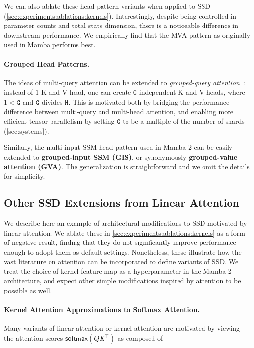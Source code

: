 We can also ablate these head pattern variants when applied to SSD (\ref{sec:experiments:ablations:kernels}).
Interestingly, despite being controlled in parameter counts and total state dimension, there is a noticeable difference in downstream performance. We empirically find that the MVA pattern as originally used in Mamba performs best.

\paragraph{Grouped Head Patterns.}

The ideas of multi-query attention can be extended to \emph{grouped-query attention}~\citep{ainslie2023gqa}: instead of $1$ K and V head, one can create $\mathtt{G}$ independent K and V heads, where $1 < \mathtt{G}$ and $\mathtt{G}$ divides $\mathtt{H}$.
This is motivated both by bridging the performance difference between multi-query and multi-head attention, and enabling more efficient tensor parallelism by setting $\mathtt{G}$ to be a multiple of the number of shards (\ref{sec:systems}).

Similarly, the multi-input SSM head pattern used in Mamba-2 can be easily extended to \textbf{grouped-input SSM (GIS)}, or synonymously \textbf{grouped-value attention (GVA)}. The generalization is straightforward and we omit the details for simplicity.

\subsection{Other SSD Extensions from Linear Attention}
\label{sec:architecture:kernels}

We describe here an example of architectural modifications to SSD motivated by linear attention. We ablate these in \ref{sec:experiments:ablations:kernels} as a form of negative result, finding that they do not significantly improve performance enough to adopt them as default settings. Nonetheless, these illustrate how the vast literature on attention can be incorporated to define variants of SSD. We treat the choice of kernel feature map as a hyperparameter in the Mamba-2 architecture, and expect other simple modifications inspired by attention to be possible as well.

\paragraph{Kernel Attention Approximations to Softmax Attention.} Many variants of linear attention or kernel attention are motivated by viewing the attention scores $\mathsf{softmax}(QK^{\top})$ as composed of

